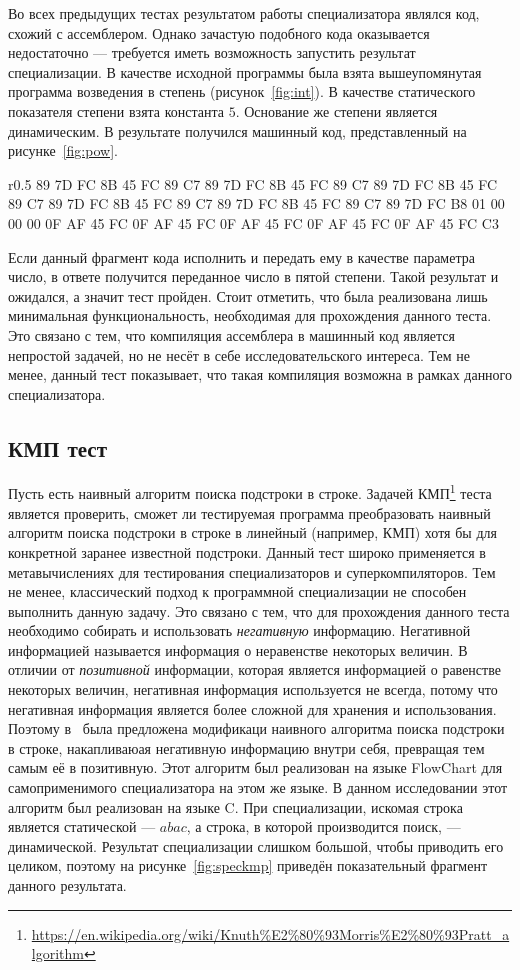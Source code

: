 Во всех предыдущих тестах результатом работы специализатора являлся код, схожий с ассемблером. Однако зачастую подобного кода оказывается недостаточно --- требуется иметь возможность запустить результат специализации. В качестве исходной программы была взята вышеупомянутая программа возведения в степень (рисунок~\ref{fig:int}). В качестве статического показателя степени взята константа $5$. Основание же степени является динамическим. В результате получился машинный код, представленный на рисунке~\ref{fig:pow}.
\begin{wrapfigure}{r}{0.5\textwidth}
89 7D FC 8B 45 FC 89 C7 89 7D FC 8B 45 FC 89 C7 89 7D FC 8B 45 FC 89 C7 89 7D FC 8B 45 FC 89 C7 89 7D FC 8B 45 FC 89 C7 89 7D FC B8 01 00 00 00 0F AF 45 FC 0F AF 45 FC 0F AF 45 FC 0F AF 45 FC 0F AF 45 FC C3
\caption{ Сумма двух чисел в машинном коде}
\label{fig:pow}
\end{wrapfigure}
Если данный фрагмент кода исполнить и передать ему в качестве параметра число, в ответе получится переданное число в пятой степени. Такой результат и ожидался, а значит тест пройден. Стоит отметить, что была реализована лишь минимальная функциональность, необходимая для прохождения данного теста. Это связано с тем, что компиляция ассемблера в машинный код является непростой задачей, но не несёт в себе исследовательского интереса. Тем не менее, данный тест показывает, что такая компиляция возможна в рамках данного специализатора.


\subsection{КМП тест}
Пусть есть наивный алгоритм поиска подстроки в строке.
Задачей КМП\footnote{\url{https://en.wikipedia.org/wiki/Knuth\%E2\%80\%93Morris\%E2\%80\%93Pratt\_algorithm}} теста является проверить,
сможет ли тестируемая программа преобразовать наивный алгоритм поиска подстроки в строке в линейный (например, КМП) хотя бы
для конкретной заранее известной подстроки.
Данный тест широко применяется в метавычислениях для тестирования специализаторов и суперкомпиляторов.
Тем не менее, классический подход к программной специализации не способен выполнить данную задачу.
Это связано с тем, что для прохождения данного теста необходимо собирать и использовать \emph{негативную} информацию.
Негативной информацией называется информация о неравенстве некоторых величин.
В отличии от \emph{позитивной} информации, которая является информацией о равенстве некоторых величин,
негативная информация используется не всегда, потому что негативная информация является более сложной для
хранения и использования.
Поэтому в~\cite{PEAPG} была предложена модификаци наивного алгоритма поиска подстроки в строке,
накапливаюая негативную информацию внутри себя, превращая тем самым её в позитивную.
Этот алгоритм был реализован на языке \textsf{FlowChart} для самоприменимого специализатора на этом же языке. В данном исследовании этот алгоритм был реализован на языке \textsf{C}.  При специализации, искомая строка является статической --- $abac$, а строка, в которой производится поиск, --- динамической. Результат специализации слишком большой, чтобы приводить его целиком, поэтому на рисунке~\ref{fig:speckmp} приведён показательный фрагмент данного результата. 

